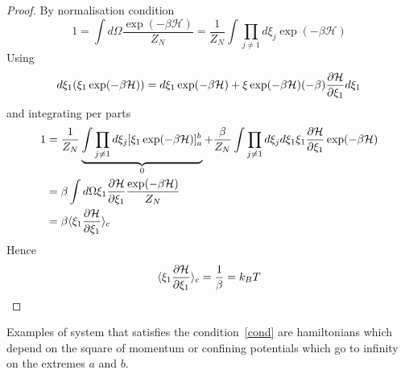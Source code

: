     \begin{proof}
        By normalisation condition 
        \begin{equation*}
            1 = \int d\Omega \frac{\exp(-\beta \mathcal H)}{Z_N} = \frac{1}{Z_N} \int \prod_{j \neq 1} d \xi_j \exp(-\beta \mathcal H)
        \end{equation*}
        Using
        \begin{equation*}
            d\xi_1 (\xi_1 \exp(-\beta \mathcal H)) = d\xi_1 \exp(-\beta \mathcal H) + \xi \exp(-\beta \mathcal H) (-\beta) \frac{\partial\mathcal H}{\partial\xi_1} d\xi_1
        \end{equation*}
        and integrating per parts
        \begin{equation*}
        \begin{aligned}        
            1 & = \frac{1}{Z_N} \underbrace{\int \prod_{j \neq 1} d \xi_j [\xi_1 \exp(-\beta \mathcal H)]_a^b}_{0} + \frac{\beta}{Z_N} \int \prod_{j \neq 1} d \xi_j d\xi_1 \xi_1 \frac{\partial\mathcal H}{\partial\xi_1} \exp (-\beta \mathcal H) \\ & = \beta \int d\Omega \xi_1 \frac{\partial\mathcal H}{\partial\xi_1} \frac{\exp (- \beta \mathcal H)}{Z_N} \\ & = \beta \langle\xi_1 \frac{\partial\mathcal H}{\partial\xi_1}\rangle_{c}
        \end{aligned}
        \end{equation*}
        Hence
        \begin{equation*}
            \langle\xi_1 \frac{\partial\mathcal H}{\partial\xi_1}\rangle_{c} = \frac{1}{\beta} = k_B T
        \end{equation*}
    \end{proof}

    Examples of system that satisfies the condition~\eqref{cond} are hamiltonians which depend on the square of momentum or confining potentials which go to infinity on the extremes $a$ and $b$. 
